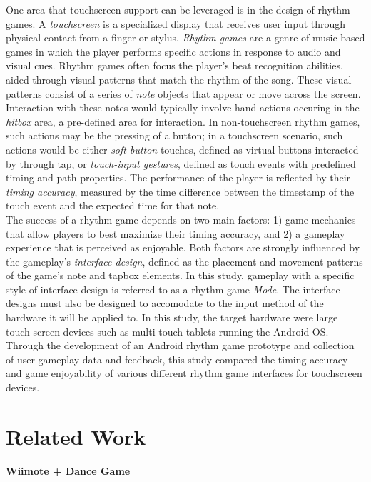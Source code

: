 \documentclass{sig-alternate}
\begin{document}
One area that touchscreen support can be leveraged is in the design of rhythm games. A \textit{touchscreen} is a specialized display that receives user input through physical contact from a finger or stylus. \textit{Rhythm games} are a genre of music-based games in which the player performs specific actions in response to audio and visual cues. Rhythm games often focus the player's beat recognition abilities, aided through visual patterns that match the rhythm of the song. These visual patterns consist of a series of \textit{note} objects that appear or move across the screen. Interaction with these notes would typically involve hand actions occuring in the \textit{hitbox} area, a pre-defined area for interaction. In non-touchscreen rhythm games, such actions may be the pressing of a button; in a touchscreen scenario, such actions would be either \textit{soft button} touches, defined as virtual buttons interacted by through tap, or \textit{touch-input gestures}, defined as touch events with predefined timing and path properties. The performance of the player is reflected by their \textit{timing accuracy}, measured by the time difference between the timestamp of the touch event and the expected time for that note.\\

The success of a rhythm game depends on two main factors: 1) game mechanics that allow players to best maximize their timing accuracy, and 2) a gameplay experience that is perceived as enjoyable. Both factors are strongly influenced by the gameplay's \textit{interface design}, defined as the placement and movement patterns of the game's note and tapbox elements. In this study, gameplay with a specific style of interface design is referred to as a rhythm game \textit{Mode}. The interface designs must also be designed to accomodate to the input method of the hardware it will be applied to. In this study, the target hardware were large touch-screen devices such as multi-touch tablets running the Android OS. Through the development of an Android rhythm game prototype and collection of user gameplay data and feedback, this study compared the timing accuracy and game enjoyability of various different rhythm game interfaces for touchscreen devices.

\section{Related Work}
\label{sec:related_work}

\noindent \textbf{Wiimote + Dance Game}
\end{document}
